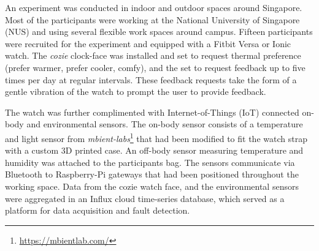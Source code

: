 
An experiment was conducted in indoor and outdoor spaces around Singapore. Most of the participants were working at the National University of Singapore (NUS) and using several flexible work spaces around campus. Fifteen participants were recruited for the experiment and equipped with a Fitbit Versa or Ionic watch. The \emph{cozie} clock-face was installed and set to request thermal preference (prefer warmer, prefer cooler, comfy), and the set to request feedback up to five times per day at regular intervals. These feedback requests take the form of a gentle vibration of the watch to prompt the user to provide feedback.

The watch was further complimented with Internet-of-Things (IoT) connected on-body and environmental sensors. The on-body sensor consists of a temperature and light sensor from \emph{mbient-labs}\footnote{\url{https://mbientlab.com/}} that had been modified to fit the watch strap with a custom 3D printed case. An off-body sensor measuring temperature and humidity was attached to the participants bag. The sensors communicate via Bluetooth to Raspberry-Pi gateways that had been positioned throughout the working space. Data from the cozie watch face, and the environmental sensors were aggregated in an Influx cloud time-series database, which served as a platform for data acquisition and fault detection. 



